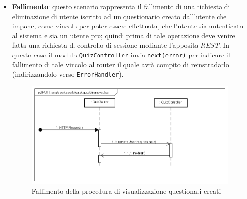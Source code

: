 \begin{itemize}
\item \textbf{Fallimento}: questo scenario rappresenta il fallimento di una richiesta di eliminazione di utente iscritto ad un questionario creato dall'utente che impone, come vincolo per poter essere effettuata, che l'utente sia autenticato al sistema e sia un utente pro; quindi prima di tale operazione deve venire fatta una richiesta di controllo di sessione mediante l'apposita \textit{REST}. In questo caso il modulo \texttt{QuizController} invia \texttt{next(error)} per indicare il fallimento di tale vincolo al router il quale avrà compito di reinstradarlo (indirizzandolo verso \texttt{ErrorHandler}).
\label{Fallimento della procedura di rimozione di un utente iscritto ad un questionario creato}
\begin{figure}[ht]
	\centering
	\includegraphics[scale=0.40]{UML/DiagrammiDiSequenza/Back-end/PUT_LangUserUserIdQuizQuizIdRemoveUserFailure.png}
	\caption{Fallimento della procedura di visualizzazione questionari creati}
\end{figure}
\FloatBarrier
\end{itemize}


